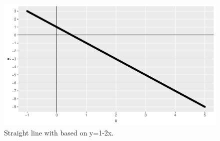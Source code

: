 \documentclass{article}\usepackage[]{graphicx}\usepackage[]{color}
\makeatletter
\def\maxwidth{ %
  \ifdim\Gin@nat@width>\linewidth
    \linewidth
  \else
    \Gin@nat@width
  \fi
}
\newenvironment{knitrout}{}{} %
\makeatother
\begin{document}
\begin{knitrout}
\color{fgcolor}\begin{figure}

{\centering \includegraphics[width=\maxwidth]{figure/lm_7-1} 

}

\caption[Straight line with based on y=1-2x]{Straight line with based on y=1-2x.}\label{fig:lm_7}
\end{figure}


\end{knitrout}
\end{document}
